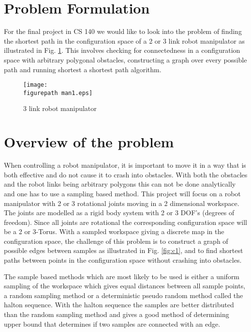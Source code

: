 \newcommand{\figurepath}{./figures/}
\newcommand{\figurescale}{0.6}
\newcommand{\codepath}{../matlab/}
\setlength\parindent{24pt}

\section*{Problem Formulation}
For the final project in CS 140 we would like to look into the problem of finding the shortest path in the configuration space of a 2 or 3 link robot manipulator as illustrated in Fig. \ref{fig:man1}. This involves checking for connectedness in a configuration space with arbitrary polygonal obstacles, constructing a graph over every possible path and running shortest a shortest path algorithm. 


\begin{figure}[h!] 
 \center 
 \texttt{[image: \\figurepath man1.eps]}
 \caption{ 3 link robot manipulator \label{fig:man1}}
 \end{figure}

\section*{Overview of the problem}
When controlling a robot manipulator, it is important to move it in a way that is both effective and do not cause it to crash into obstacles. With both the obstacles and the robot links being arbitrary polygons this can not be done analytically and one has to use a sampling based method. This project will focus on a robot manipulator with 2 or 3 rotational joints moving in a 2 dimensional workspace. The joints are modelled as a rigid body system with 2 or 3 DOF's (degrees of freedom). Since all joints are rotational the corresponding configuration space will be a 2 or 3-Torus. With a sampled workspace giving a discrete map in the configuration space, the challenge of this problem is to construct a graph of possible edges between samples as illustrated in Fig. \ref{fig:c1}, and to find shortest paths between points in the configuration space without crashing into obstacles. 
\\
\par 

The sample based methods which are most likely to be used is either a uniform sampling of the workspace which gives equal distances between all sample points, a random sampling method or a deterministic pseudo random method called the halton sequence. With the halton sequence the samples are better distributed than the random sampling method and gives a good method of determining upper bound that determines if two samples are connected with an edge.





